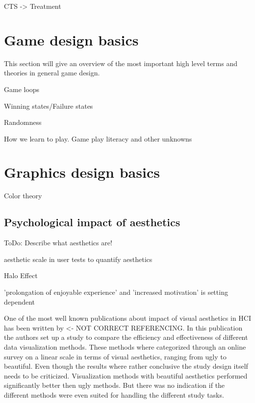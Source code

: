 \gls{CTS} -> Treatment \cite{van2007repetitive}


\section{Game design basics}

This section will give an overview of the most important high level terms and theories in general game design.

Game loops

Winning states/Failure states

Randomness

How we learn to play. Game play literacy and other unknowns


\section{Graphics design basics}

Color theory

\subsection{Psychological impact of aesthetics}

ToDo: Describe what aesthetics are!

aesthetic scale in user tests to quantify aesthetics

Halo Effect

'prolongation of enjoyable experience' and 'increased motivation' is setting dependent \cite{sonderegger2010influence}

One of the most well known publications about impact of visual aesthetics in \gls{HCI} has been written by  <- NOT CORRECT REFERENCING.
In this publication the authors set up a study to compare the efficiency and effectiveness of different data visualization methods.
These methods where categorized through an online survey on a linear scale in terms of visual aesthetics, ranging from ugly to beautiful.
Even though the results where rather conclusive the study design itself needs to be criticized.
Visualization methods with beautiful aesthetics performed significantly better then ugly methods. 
But there was no indication if the different methods were even suited for handling the different study tasks.

